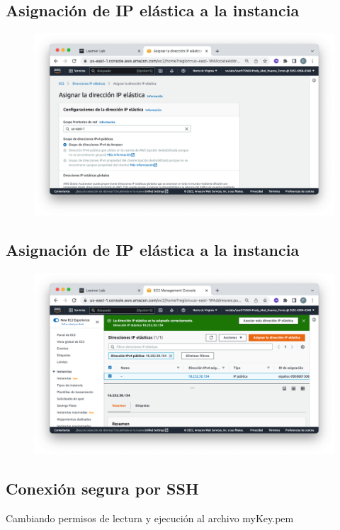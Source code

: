\subsection{Asignación de IP elástica a la instancia}
\begin{figure}[h]
	\centering
	\includegraphics[scale=.35] {img/09-asignacionDeIpElastica}
	\caption{}
	\label{fig:9}	
\end{figure}

\clearpage

\subsection{Asignación de IP elástica a la instancia}
\begin{figure}[h]
	\centering
	\includegraphics[scale=.35] {img/10-asigacionCorrectaIpElastica}
	\caption{}
	\label{fig:10}	
\end{figure}

\subsection{Conexión segura por SSH}
Cambiando permisos de lectura y ejecución al archivo myKey.pem


